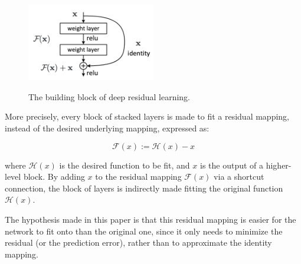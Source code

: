 \begin{figure}[h]
	\center
	\includegraphics[width=0.5\textwidth]{figure/resblock.png}
	\label{fig:resblock}
	\caption{The building block of deep residual learning.}
\end{figure}

More precisely, every block of stacked layers is made to fit a residual
mapping, instead of the desired underlying mapping, expressed as:

\begin{equation}
	\mathcal{F}(x):=\mathcal{H}(x)-x
\end{equation}

where $\mathcal{H}(x)$ is the desired function to be fit, and $x$ is the output of a
higher-level block. By adding $x$ to the residual mapping $\mathcal{F}(x)$ via a shortcut
connection, the block of layers is indirectly made fitting the original
function $\mathcal{H}(x)$.

The hypothesis made in this paper is that this residual
mapping is easier for the network to fit onto than the original one, since it
only needs to minimize the residual (or the prediction error), rather than to
approximate the identity mapping.
